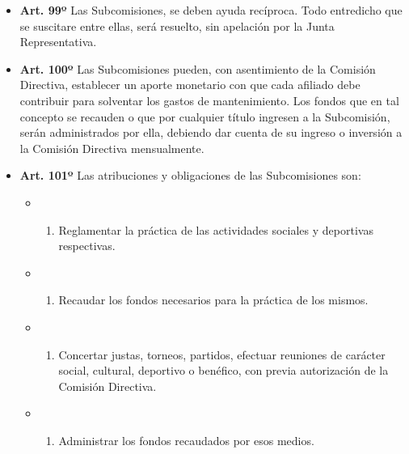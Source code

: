 \documentclass[]{book}
\providecommand{\tightlist}{%
  \setlength{\itemsep}{0pt}\setlength{\parskip}{0pt}}
\begin{document}
\begin{itemize}
\tightlist
\item
  \textbf{Art. 99º}
  Las Subcomisiones, se deben ayuda recíproca. Todo entredicho que se suscitare entre ellas, será resuelto, sin apelación por la Junta Representativa.
\end{itemize}

\begin{itemize}
\tightlist
\item
  \textbf{Art. 100º}
  Las Subcomisiones pueden, con asentimiento de la Comisión Directiva, establecer un aporte monetario con que cada afiliado debe contribuir para solventar los gastos de mantenimiento. Los fondos que en tal concepto se recauden o que por cualquier título ingresen a la Subcomisión, serán administrados por ella, debiendo dar cuenta de su ingreso o inversión a la Comisión Directiva mensualmente.
\end{itemize}

\begin{itemize}
\tightlist
\item
  \textbf{Art. 101º}
  Las atribuciones y obligaciones de las Subcomisiones son:

  \begin{itemize}
  \item
    \begin{enumerate}
    \def\labelenumi{\alph{enumi})}
    \tightlist
    \item
      Reglamentar la práctica de las actividades sociales y deportivas respectivas.
    \end{enumerate}
  \item
    \begin{enumerate}
    \def\labelenumi{\alph{enumi})}
    \setcounter{enumi}{1}
    \tightlist
    \item
      Recaudar los fondos necesarios para la práctica de los mismos.
    \end{enumerate}
  \item
    \begin{enumerate}
    \def\labelenumi{\alph{enumi})}
    \setcounter{enumi}{2}
    \tightlist
    \item
      Concertar justas, torneos, partidos, efectuar reuniones de carácter social, cultural, deportivo o benéfico, con previa autorización de la Comisión Directiva.
    \end{enumerate}
  \item
    \begin{enumerate}
    \def\labelenumi{\alph{enumi})}
    \setcounter{enumi}{3}
    \tightlist
    \item
      Administrar los fondos recaudados por esos medios.
    \end{enumerate}
  \end{itemize}
\end{itemize}
\end{document}
